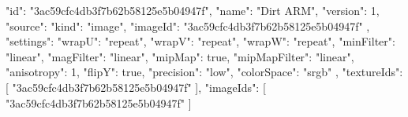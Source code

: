 {
  "id": "3ac59cfc4db3f7b62b58125e5b04947f",
  "name": "Dirt ARM",
  "version": 1,
  "source": {
    "kind": "image",
    "imageId": "3ac59cfc4db3f7b62b58125e5b04947f"
  },
  "settings": {
    "wrapU": "repeat",
    "wrapV": "repeat",
    "wrapW": "repeat",
    "minFilter": "linear",
    "magFilter": "linear",
    "mipMap": true,
    "mipMapFilter": "linear",
    "anisotropy": 1,
    "flipY": true,
    "precision": "low",
    "colorSpace": "srgb"
  },
  "textureIds": [
    "3ac59cfc4db3f7b62b58125e5b04947f"
  ],
  "imageIds": [
    "3ac59cfc4db3f7b62b58125e5b04947f"
  ]
}
